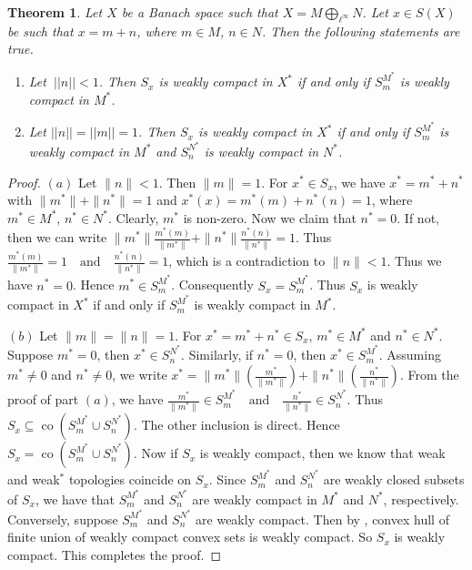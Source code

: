\documentclass[12pt]{amsart}
\newtheorem{theorem}{Theorem}[section]
\theoremstyle{definition}
\numberwithin{equation}{section}
\begin{document}
\begin{theorem}\label{2T1}
    Let $X$ be a Banach space such that $X=M\bigoplus_{\ell^{\infty}}N$. Let $x\in S(X)$ be such that $x=m+n$, where $m\in M$, $n\in N$. Then the following statements are true.
    \begin{enumerate}[label=(\alph*)]
    \item Let $\ ||n|| < 1$. Then $S_{x}$ is weakly compact in $X^*$ if and only if $S^{M^*}_{m}$ is weakly compact in $M^*$.
    \item Let $||n||=||m||= 1$. Then $S_{x}$ is weakly compact in $X^*$ if and only if $S^{M^*}_{m}$ is weakly compact in $M^*$ and $S^{N^*}_{n}$ is weakly compact in $N^*$.
    \end{enumerate}
\end{theorem}
\begin{proof} $(a)$ Let $\|n\|<1$. Then $\|m\|=1$. For $x^* \in S_{x}$, we have $x^* = m^* + n^*$ with $\|m^*\| + \|n^*\| = 1$ and  $x^*(x) = m^*(m) + n^*(n) = 1$, where $m^*\in M^*$, $n^*\in N^*$. Clearly, $m^*$ is non-zero. Now we claim that $n^*=0$. If not, then we can write $\|m^*\|\frac{ m^*(m)}{\|m^*\|} + \|n^*\| \frac{n^*(n)}{\|n^*\|} = 1$. Thus $\frac{m^*(m)}{\|m^*\|} = 1 \quad \text{and} \quad \frac{n^*(n)}{\|n^*\|} = 1$, which is a contradiction to $\|n\| < 1$. Thus we have $n^* = 0$. Hence $m^*\in S^{M^*}_m$. Consequently $S_{x} = S^{M^*}_{m}$. Thus $S_{x}$ is weakly compact in $X^*$ if and only if $S^{M^*}_{m}$ is weakly compact in $M^*$.  
    
$(b)$ Let $\|m\| = \|n\| = 1$. For $x^*=m^*+n^* \in S_{x}$, $m^*\in M^*$ and $n^*\in N^*$. Suppose $m^*=0$, then $x^*\in S_n^{N^*}$. Similarly, if $n^*=0$, then $x^*\in S_{m}^{M^*}$. Assuming $m^*\neq 0$ and $n^*\neq 0$, we write $x^* = \|m^*\| \left( \frac{m^*}{\|m^*\|} \right) + \|n^*\| \left( \frac{n^*}{\|n^*\|} \right)$. From the proof of part $(a)$, we have $\frac{m^*}{\|m^*\|} \in S^{M^*}_{m} \quad \text{and} \quad \frac{n^*}{\|n^*\|} \in S^{N^*}_{n}$. Thus $S_{x} \subseteq \operatorname{co} ( S^{M^*}_{m}  \cup  S^{N^*}_{n})$. The other inclusion is direct. Hence $S_{x} = \operatorname{co} ( S^{M^*}_{m}  \cup S^{N^*}_{n})$.
Now if $S_{x}$ is weakly compact, then we know that weak and weak$^*$ topologies coincide on $S_{x}$. Since $S^{M^*}_{m}$ and $S^{N^*}_{n}$ are weakly closed subsets of $S_{x}$, we have that $S^{M^*}_{m}$ and $S^{N^*}_{n}$ are weakly compact in $M^*$ and $N^*$, respectively. Conversely, suppose $S^{M^*}_{m}$ and $S^{N^*}_{n}$ are weakly compact. Then  by \cite[Theorem~3.20.$(a)$]{RW}, convex hull of finite union of weakly compact convex sets is weakly compact. So $S_{x}$ is weakly compact. This completes the proof.
\end{proof}
\end{document}
